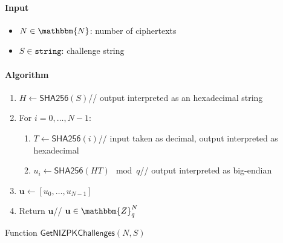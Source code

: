 \documentclass[a4paper]{article}
\newcommand{\Z}{\mathbbm{Z}}
\newcommand{\N}{\mathbbm{N}}
\newcommand{\shatwo}{\textsf{SHA256}}
\newcommand{\jstring}{\texttt{string}}
\begin{document}
\begin{table}
  \begin{framed}
    \noindent\paragraph{Input}
    \begin{itemize}
    \item $N\in\N$: number of ciphertexts
    \item $S\in\jstring$: challenge string
    \end{itemize}
    \noindent\paragraph{Algorithm}
    \begin{enumerate}
    \item $H\leftarrow\shatwo(S)$\hfill// output interpreted as an
      hexadecimal string
    \item For $i=0,\dots,N-1$:
      \begin{enumerate}
      \item $T\leftarrow\shatwo(i)$\hfill// input taken as decimal,
        output interpreted as hexadecimal
      \item $u_i\leftarrow\shatwo(HT)\mod q$\hfill// output
        interpreted as big-endian
      \end{enumerate}
    \item $\textbf{u}\leftarrow[u_0,\dots,u_{N-1}]$
    \item Return $\textbf{u}$\hfill// $\textbf{u}\in\Z_q^N$
    \end{enumerate}
  \end{framed}
  \caption{Function $\mathsf{GetNIZPKChallenges}(N,S)$}
  \label{get-nizkp-challenges}
\end{table}
\end{document}
